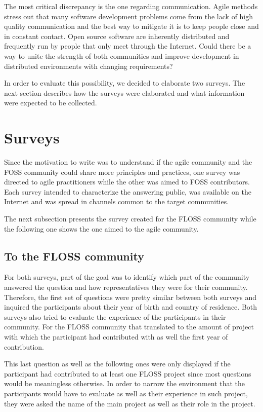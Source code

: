 \documentclass[lnbip]{svmultln}
\begin{document}
The most critical discrepancy is the one regarding
communication. Agile methods stress out that many software development
problems come from the lack of high quality communication and the best
way to mitigate it is to keep people close and in constant
contact. Open source software are inherently distributed and
frequently run by people that only meet through the Internet. Could
there be a way to unite the strength of both communities and improve
development in distributed environments with changing requirements?

In order to evaluate this possibility, we decided to elaborate two
surveys. The next section describes how the surveys were elaborated
and what information were expected to be collected.

\section{Surveys}
\label{sec:surveys}

Since the motivation to write was to understand if the agile community
and the FOSS community could share more principles and practices, one
survey was directed to agile practitioners while the other was aimed to
FOSS contributors.  Each survey intended to characterize the answering
public, was available on the Internet and was spread in channels
common to the target communities.

The next subsection presents the survey created for the FLOSS
community while the following one shows the one aimed to the agile
community.

\subsection{To the FLOSS community}
\label{subsec:floss-survey}

For both surveys, part of the goal was to identify which part of the
community answered the question and how representatives they were for
their community. Therefore, the first set of questions were pretty
similar between both surveys and inquired the participants about their
year of birth and country of residence. Both surveys also tried to
evaluate the experience of the participants in their community. For
the FLOSS community that translated to the amount of project with
which the participant had contributed with as well the first year of
contribution.

This last question as well as the following ones were only displayed
if the participant had contributed to at least one FLOSS project since
most questions would be meaningless otherwise. In order to narrow the
environment that the participants would have to evaluate as well as
their experience in such project, they were asked the name of the main
project as well as their role in the project.
\end{document}
